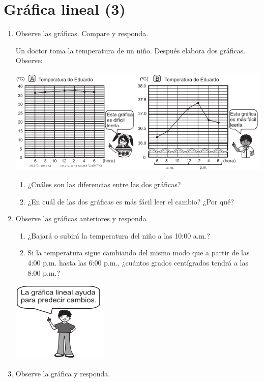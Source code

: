 \documentclass[10pt,twoside]{article}
\begin{document}
\section*{Gr\'{a}fica lineal (3)}
\begin{enumerate}
\item Observe las gr\'{a}ficas. Compare y responda.

Un doctor toma la temperatura de un niño. Despu\'{e}s elabora dos gr\'{a}ficas. Observe:
\begin{center}
\includegraphics[scale=.52]{Images/grafica06.png} 
\end{center}
\begin{enumerate}
\item ¿Cuáles son las diferencias entre las dos gráficas?
\item ¿En cuál de las dos gráficas es más fácil leer el cambio? ¿Por qué?
\end{enumerate}
\item Observe las gráficas anteriores y responda

\begin{minipage}{.65\textwidth}
\begin{enumerate}
\item ¿Bajará o subirá la temperatura del niño a las 10:00 a.m.?
\item Si la temperatura sigue cambiando del mismo modo que a partir de las 4:00 p.m. hasta las 6:00 p.m., ¿cuántos grados centígrados tendrá a las 8:00 p.m.?
\end{enumerate}
\end{minipage}
\begin{minipage}{.35\textwidth}
\includegraphics[scale=.55]{Images/nino.png} 
\end{minipage}
\item Observe la gráfica y responda.


\end{enumerate}
\end{document}
